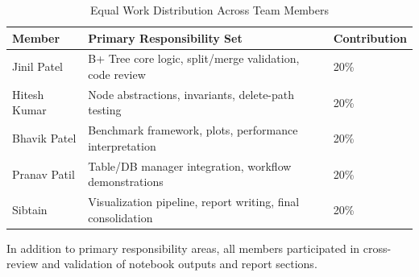 \documentclass[12pt, a4paper]{article}
\begin{document}
\begin{table}[H]
\centering
\caption{Equal Work Distribution Across Team Members}
\begin{tabular}{@{}lll@{}}
\toprule
Member & Primary Responsibility Set & Contribution \\
\midrule
Jinil Patel & B+ Tree core logic, split/merge validation, code review & 20\% \\
Hitesh Kumar & Node abstractions, invariants, delete-path testing & 20\% \\
Bhavik Patel & Benchmark framework, plots, performance interpretation & 20\% \\
Pranav Patil & Table/DB manager integration, workflow demonstrations & 20\% \\
Sibtain & Visualization pipeline, report writing, final consolidation & 20\% \\
\bottomrule
\end{tabular}
\end{table}

In addition to primary responsibility areas, all members participated in cross-review and validation of notebook outputs and report sections.
\end{document}
